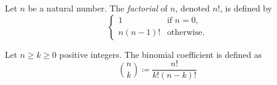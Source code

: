 \begin{definition} 
    Let $n$ be a natural number. The \emph{factorial} of $n$, denoted $n!$, is defined by
    \begin{equation*}
        \begin{cases}
            1 & \text{if } n = 0, \\
            n(n-1)! & \text{otherwise}.
        \end{cases}
    \end{equation*}
\end{definition}
\begin{proposition}
    
\end{proposition}
\begin{definition}
    Let $n \geq k \geq 0$ positive integers. The binomial coefficient is defined as
    \begin{equation}
        \binom{n}{k} \coloneqq \frac{n!}{k!(n-k)!}
    \end{equation}  
\end{definition}